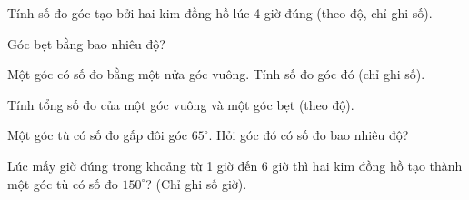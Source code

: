 \begin{ex} %
Tính số đo góc tạo bởi hai kim đồng hồ lúc 4 giờ đúng (theo độ, chỉ ghi số).
\end{ex}

\begin{ex} %
Góc bẹt bằng bao nhiêu độ?
\end{ex}

\begin{ex} %
Một góc có số đo bằng một nửa góc vuông. Tính số đo góc đó (chỉ ghi số).
\end{ex}

\begin{ex} %
Tính tổng số đo của một góc vuông và một góc bẹt (theo độ).
\end{ex}

\begin{ex} %
Một góc tù có số đo gấp đôi góc $65^\circ$. Hỏi góc đó có số đo bao nhiêu độ?
\end{ex}

\begin{ex} %
Lúc mấy giờ đúng trong khoảng từ 1 giờ đến 6 giờ thì hai kim đồng hồ tạo thành một góc tù có số đo $150^\circ$? (Chỉ ghi số giờ).
\end{ex}
